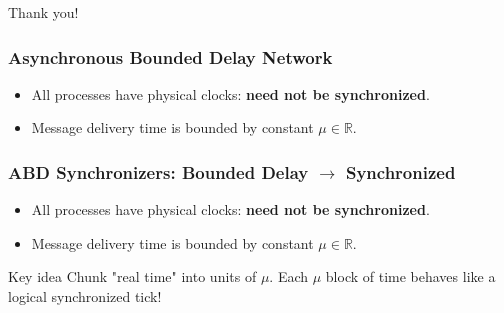 \documentclass{beamer}
\begin{document}
\begin{frame}
    Thank you!
\end{frame}

\begin{frame}
    \frametitle{Asynchronous Bounded Delay Network}
    \begin{itemize}
    \item All processes have physical clocks: \textbf{need not be synchronized}.
    \item Message delivery time is bounded by constant $\mu \in \mathbb R$.
    \end{itemize}
\end{frame}

\begin{frame}
    \frametitle{ABD Synchronizers: Bounded Delay $\rightarrow$ Synchronized}
    \begin{itemize}
    \item All processes have physical clocks: \textbf{need not be synchronized}.
    \item Message delivery time is bounded by constant $\mu \in \mathbb R$.
    \end{itemize}

    \begin{block}{Key idea}
        Chunk "real time" into units of $\mu$. Each $\mu$ block of time
        behaves like a logical synchronized tick!
    \end{block}
\end{frame}
\end{document}
